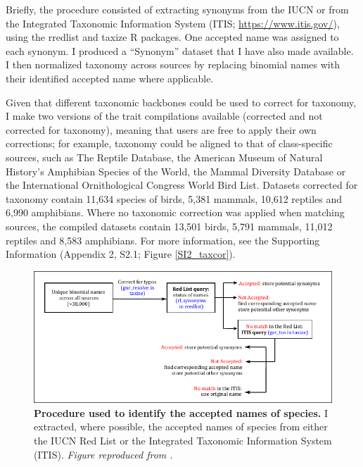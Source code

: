 Briefly, the procedure consisted of extracting synonyms from the IUCN \citep{IUCN2020} or from the Integrated Taxonomic Information System (ITIS; \url{https://www.itis.gov/}), using the rredlist \citep{rredlist} and taxize \citep{Chamberlain2013} R packages. One accepted name was assigned to each synonym. I produced a “Synonym” dataset that I have also made available. I then normalized taxonomy across sources by replacing binomial names with their identified accepted name where applicable.

Given that different taxonomic backbones could be used to correct for taxonomy, I make two versions of the trait compilations available (corrected and not corrected for taxonomy), meaning that users are free to apply their own corrections; for example, taxonomy could be aligned to that of class-specific sources, such as The Reptile Database, the American Museum of Natural History’s Amphibian Species of the World, the Mammal Diversity Database or the International Ornithological Congress World Bird List. Datasets corrected for taxonomy contain 11,634 species of birds, 5,381 mammals, 10,612 reptiles and 6,990 amphibians. Where no taxonomic correction was applied when matching sources, the compiled datasets contain 13,501 birds, 5,791 mammals, 11,012 reptiles and 8,583 amphibians. For more information, see the Supporting Information (Appendix 2, S2.1; Figure \ref{SI2_taxcor}).

\vskip 1cm
\begin{figure}[h!]
\centering
\includegraphics[scale=1.4]{figures/Chapter1/Taxonomic_corrections_chart}
\caption[Procedure used to identify the accepted names of species.]{\textbf{Procedure used to identify the accepted names of species.} I extracted, where possible, the accepted names of species from either the IUCN Red List or the Integrated Taxonomic Information System (ITIS). \textit{Figure reproduced from \citet{Etard2020}.}}
\label{chart_taxcor}
\end{figure}


